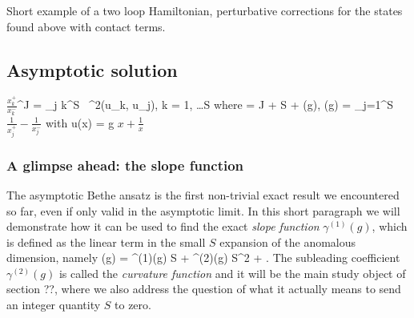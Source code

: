 Short example of a two loop Hamiltonian, perturbative corrections for the states found above with contact terms.

\subsection{Asymptotic solution}

\beq
	\label{eq:sl2_aba}
	\( \frac{x_k^+}{x_k^-} \)^J = \prod_{j \neq k}^S  \,  \; \sigma^2(u_k, u_j), \;\;\; k = 1, \dots S
\eeq
where 
\beq
	\Delta = J + S + \gamma(g), \;\;\; \gamma(g) =  \sum_{j=1}^S \( \frac{1}{x_j^+} - \frac{1}{x_j^-} \)
\eeq
with
\beq
\label{eq:u_of_x}
u(x) = g \(x + \frac{1}{x}\)
\eeq

\subsubsection{A glimpse ahead: the slope function}

The asymptotic Bethe ansatz  is the first non-trivial exact result we encountered so far, even if only valid in the asymptotic limit. In this short paragraph we will demonstrate how it can be used to find the exact \emph{slope function} $\gamma^{(1)}(g)$, which is defined as the linear term in the small $S$ expansion of the anomalous dimension, namely
\beq
	\gamma(g) = \gamma^{(1)}(g) \; S + \gamma^{(2)}(g) \; S^2 + .
\eeq
The subleading coefficient $\gamma^{(2)}(g)$ is called the \emph{curvature function} and it will be the main study object of section ??, where we also address the question of what it actually means to send an integer quantity $S$ to zero. 

